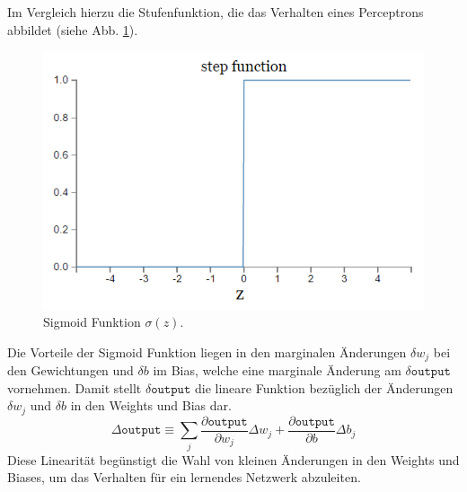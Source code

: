 \noindent
Im Vergleich hierzu die Stufenfunktion, die das Verhalten eines Perceptrons abbildet (siehe Abb. \ref{fig:perceptron_plot}).
\begin{figure}[hbt]
	\centering
	\includegraphics[scale=0.6]{Bilder/perceptron_plot}
	\caption{Sigmoid Funktion $\sigma(z)$.} 
	\label{fig:perceptron_plot} 
\end{figure}
Die Vorteile der Sigmoid Funktion liegen in den marginalen Änderungen $\delta w_j$ bei den Gewichtungen und $\delta b$ im Bias, welche eine marginale Änderung am $\delta\mathtt{output}$ vornehmen. Damit stellt $\delta\mathtt{output}$ die lineare Funktion bezüglich der Änderungen  $\delta w_j$ und $\delta b$ in den Weights und Bias dar.
\begin{equation}
	\Delta\mathtt{output} \equiv \sum_{j}{\frac{\partial\mathtt{output}}{\partial w_j}\Delta w_j+\frac{\partial\mathtt{output}}{\partial b}\Delta b_j}
\end{equation}
Diese Linearität begünstigt die Wahl von kleinen Änderungen in den Weights und Biases, um das Verhalten für ein lernendes Netzwerk abzuleiten.   

